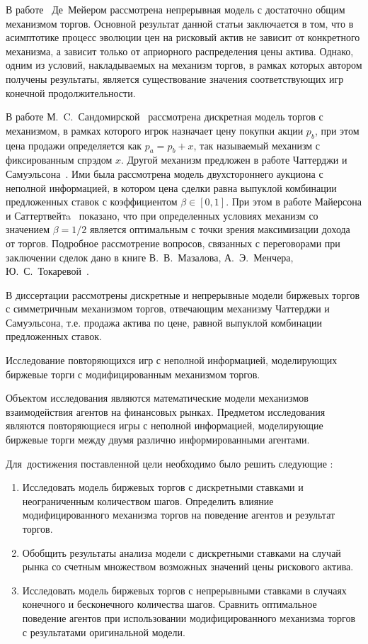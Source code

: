 В работе~\cite{demeyer10} Де~Мейером рассмотрена непрерывная модель с достаточно общим механизмом торгов.
Основной результат данной статьи заключается в том, что в асимптотике процесс эволюции цен на рисковый актив не зависит от конкретного механизма, а зависит только от априорного распределения цены актива.
Однако, одним из условий, накладываемых на механизм торгов, в рамках которых автором получены результаты, является существование значения соответствующих игр конечной продолжительности.

В работе М.~C.~Сандомирской~\cite{sandomirskaya14} рассмотрена дискретная модель торгов с механизмом, в рамках которого игрок назначает цену покупки акции $p_b$, при этом цена продажи определяется как $p_a = p_b + x$, так называемый механизм с фиксированным спрэдом $x$.
Другой механизм предложен в работе Чаттерджи и Самуэльсона~\cite{chatterjee83}.
Ими была рассмотрена модель двухстороннего аукциона с неполной информацией, в котором цена сделки равна выпуклой комбинации предложенных ставок с коэффициентом $\beta \in [0, 1]$.
При этом в работе Майерсона и Саттертвейтa~\cite{myerson83} показано, что при определенных условиях механизм со значением $\beta = 1/2$ является оптимальным с точки зрения максимизации дохода от торгов.
Подробное рассмотрение вопросов, связанных с переговорами при заключении сделок дано в книге В.~В.~Мазалова, А.~Э.~Менчера, Ю.~С.~Токаревой~\cite{mazalov12}.

{\progress} 
В диссертации рассмотрены дискретные и непрерывные модели биржевых торгов с симметричным механизмом торгов, отвечающим механизму Чаттерджи и Самуэльсона, т.е. продажа актива по цене, равной выпуклой комбинации предложенных ставок.

{\aim} Исследование повторяющихся игр с неполной информацией, моделирующих биржевые торги с модифицированным механизмом торгов.

{\researchsubject} Объектом исследования являются математические модели механизмов взаимодействия агентов на финансовых рынках.
Предметом исследования являются повторяющиеся игры с неполной информацией, моделирующие биржевые торги между двумя различно информированными агентами.

Для~достижения поставленной цели необходимо было решить следующие {\tasks}:
\begin{enumerate}
\item 
Исследовать модель биржевых торгов с дискретными ставками и неограниченным количеством шагов.
Определить влияние модифицированного механизма торгов на поведение агентов и результат торгов.
\item 
Обобщить результаты анализа модели с дискретными ставками на случай рынка со счетным множеством возможных значений цены рискового актива.
\item 
Исследовать модель биржевых торгов с непрерывными ставками в случаях конечного и бесконечного количества шагов.
Сравнить оптимальное поведение агентов при использовании модифицированного механизма торгов с результатами оригинальной модели.
\end{enumerate}

